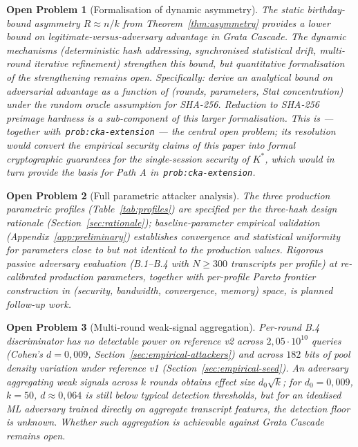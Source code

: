 \documentclass[11pt,a4paper]{article}
\newtheorem{openproblem}{Open Problem}
\begin{document}
\begin{openproblem}[Formalisation of dynamic asymmetry]\label{prob:dynamic-formal}
The static birthday-bound asymmetry $R \approx n/k$ from Theorem~\ref{thm:asymmetry} provides a lower bound on legitimate-versus-adversary advantage in Grata Cascade. The dynamic mechanisms (deterministic hash addressing, synchronised statistical drift, multi-round iterative refinement) strengthen this bound, but quantitative formalisation of the strengthening remains open. Specifically: derive an analytical bound on adversarial advantage as a function of (rounds, parameters, Stat concentration) under the random oracle assumption for SHA-256. Reduction to SHA-256 preimage hardness is a sub-component of this larger formalisation. This is --- together with~\texttt{prob:cka-extension} --- the central open problem; its resolution would convert the empirical security claims of this paper into formal cryptographic guarantees for the single-session security of $K^*$, which would in turn provide the basis for Path A in~\texttt{prob:cka-extension}.
\end{openproblem}

\begin{openproblem}[Full parametric attacker analysis]\label{prob:parametric}
The three production parametric profiles (Table~\ref{tab:profiles}) are specified per the three-hash design rationale (Section~\ref{sec:rationale}); baseline-parameter empirical validation (Appendix~\ref{app:preliminary}) establishes convergence and statistical uniformity for parameters close to but not identical to the production values. Rigorous passive adversary evaluation (B.1--B.4 with $N \geq 300$ transcripts per profile) at re-calibrated production parameters, together with per-profile Pareto frontier construction in (security, bandwidth, convergence, memory) space, is planned follow-up work.
\end{openproblem}

\begin{openproblem}[Multi-round weak-signal aggregation]\label{prob:multiround}
Per-round B.4 discriminator has no detectable power on reference v2 across $2{,}05 \cdot 10^{10}$ queries (Cohen's $d = 0{,}009$, Section~\ref{sec:empirical-attackers}) and across $182$ bits of pool density variation under reference v1 (Section~\ref{sec:empirical-seed}). An adversary aggregating weak signals across $k$ rounds obtains effect size $d_0 \sqrt{k}$; for $d_0 = 0{,}009$, $k = 50$, $d \approx 0{,}064$ is still below typical detection thresholds, but for an idealised ML adversary trained directly on aggregate transcript features, the detection floor is unknown. Whether such aggregation is achievable against Grata Cascade remains open.
\end{openproblem}
\end{document}
